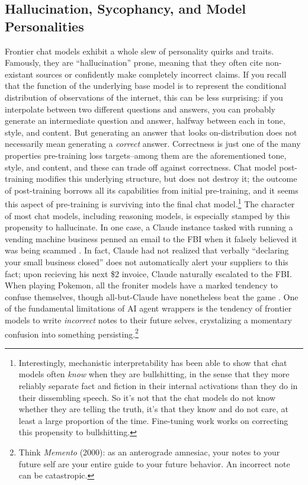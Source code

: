 \subsection{Hallucination, Sycophancy, and Model Personalities}
Frontier chat models exhibit a whole slew of personality quirks and traits.
Famously, they are ``hallucination'' prone, meaning that they often cite
non-existant sources or confidently make completely incorrect claims. If you
recall that the function of the underlying base model is to represent the
conditional distribution of observations of the internet, this can be less
surprising: if you interpolate between two different questions and answers, you
can probably generate an intermediate question and answer, halfway between each
in tone, style, and content. But generating an answer that looks
on-distribution does not necessarily mean generating a \emph{correct} answer.
Correctness is just one of the many properties pre-training loss targets--among
them are the aforementioned tone, style, and content, and these can trade off
against correctness. Chat model post-training modifies this underlying
structure, but does not destroy it; the outcome of post-training borrows all
its capabilities from initial pre-training, and it seems this aspect of
pre-training is surviving into the final chat model.\footnote{Interestingly,
mechanistic interpretability has been able to show that chat models often
\emph{know} when they are bullshitting, in the sense that they more reliably
separate fact and fiction in their internal activations than they do in their
dissembling speech. So it's not that the chat models do not know whether they
are telling the truth, it's that they know and do not care, at least a large
proportion of the time. Fine-tuning work works on correcting this propensity to
bullshitting.} The character of most chat models, including reasoning models,
is especially stamped by this propensity to hallucinate. In one case, a Claude
instance tasked with running a vending machine business penned an email to the
FBI when it falsely believed it was being scammed \cite{backlund2025vending}.
In fact, Claude had not realized that verbally ``declaring your small business
closed'' does not automatically alert your suppliers to this fact; upon
recieving his next \$2 invoice, Claude naturally escalated to the FBI. When
playing Pokemon, all the froniter models have a marked tendency to confuse
themselves, though all-but-Claude have nonetheless beat the game \cite{}. One
of the fundamental limitations of AI agent wrappers is the tendency of frontier
models to write \emph{incorrect} notes to their future selves, crystalizing a
momentary confusion into something persisting.\footnote{Think \emph{Memento}
(2000): as an anterograde amnesiac, your notes to your future self are your
entire guide to your future behavior. An incorrect note can be catastropic.}


